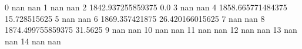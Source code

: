 0 nan nan
1 nan nan
2 1842.937255859375 0.0
3 nan nan
4 1858.665771484375 15.728515625
5 nan nan
6 1869.357421875 26.420166015625
7 nan nan
8 1874.499755859375 31.5625
9 nan nan
10 nan nan
11 nan nan
12 nan nan
13 nan nan
14 nan nan
